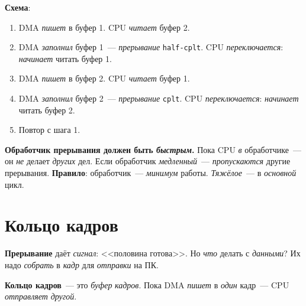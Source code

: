 \textbf{Схема}:
\begin{enumerate}
    \item DMA \emph{пишет} в буфер 1. CPU \emph{читает}
          буфер 2.
    \item DMA \emph{заполнил} буфер 1~--- \emph{прерывание}
          \texttt{half-cplt}. CPU \emph{переключается}:
          \emph{начинает} читать буфер 1.
    \item DMA \emph{пишет} в буфер 2. CPU \emph{читает}
          буфер 1.
    \item DMA \emph{заполнил} буфер 2~--- \emph{прерывание}
          \texttt{cplt}. CPU \emph{переключается}:
          \emph{начинает} читать буфер 2.
    \item Повтор с шага 1.
\end{enumerate}

\begin{warnbox}
\textbf{Обработчик прерывания должен быть \emph{быстрым}.}
Пока CPU \emph{в} обработчике~--- он \emph{не} делает
\emph{других} дел. Если обработчик \emph{медленный}~---
\emph{пропускаются} другие прерывания. \textbf{Правило}:
обработчик~--- \emph{минимум} работы. \emph{Тяжёлое}~---
в \emph{основной} цикл.
\end{warnbox}

\section{Кольцо кадров}
\label{sec:adc-ring}

\textbf{Прерывание} даёт \emph{сигнал}: <<половина готова>>.
Но \emph{что} делать с \emph{данными}? Их надо \emph{собрать}
в \emph{кадр} для \emph{отправки} на ПК.

\textbf{Кольцо кадров}~--- это \emph{буфер} \emph{кадров}.
Пока DMA \emph{пишет} в \emph{один} кадр~--- CPU \emph{отправляет}
\emph{другой}.

